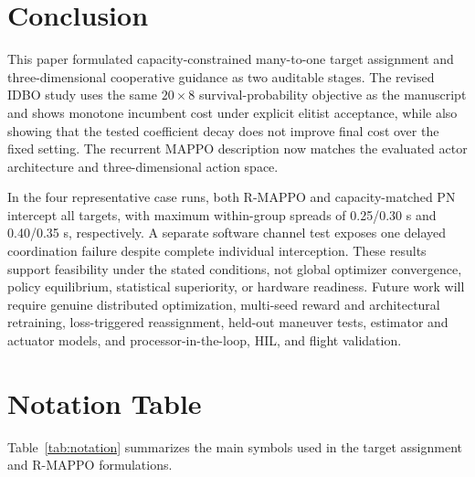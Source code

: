 \documentclass[lettersize,journal]{IEEEtran}
\begin{document}
\section{Conclusion}
\label{sec:conclusion}

This paper formulated capacity-constrained many-to-one target assignment and
three-dimensional cooperative guidance as two auditable stages. The revised IDBO
study uses the same \(20\times8\) survival-probability objective as the manuscript
and shows monotone incumbent cost under explicit elitist acceptance, while also
showing that the tested coefficient decay does not improve final cost over the
fixed setting. The recurrent MAPPO description now matches the evaluated actor
architecture and three-dimensional action space.

In the four representative case runs, both R-MAPPO and capacity-matched PN
intercept all targets, with maximum within-group spreads of 0.25/0.30 s and
0.40/0.35 s, respectively. A separate software channel test exposes one delayed
coordination failure despite complete individual interception. These results
support feasibility under the stated conditions, not global optimizer
convergence, policy equilibrium, statistical superiority, or hardware readiness.
Future work will require genuine distributed optimization, multi-seed reward and
architectural retraining, loss-triggered reassignment, held-out maneuver tests, estimator and
actuator models, and processor-in-the-loop, HIL, and flight validation.




\appendices
\section{Notation Table}
\label{app:notation}

Table~\ref{tab:notation} summarizes the main symbols used in the target assignment and
R-MAPPO formulations.
\end{document}
